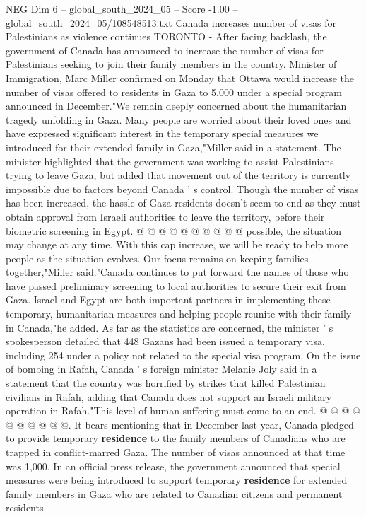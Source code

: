 \begin{textsample}{NEG Dim 6 – global\_south\_2024\_05 – Score -1.00 – global\_south\_2024\_05/108548513.txt}  \label{ex:f6_neg_241}
Canada increases number of visas for Palestinians as violence continues TORONTO - After facing backlash, the government of Canada has announced to increase the number of visas for Palestinians seeking to join their family members in the country.
Minister of Immigration, Marc Miller confirmed on Monday that Ottawa would increase the number of visas offered to residents in Gaza to 5,000 under a special program announced in December."We remain deeply concerned about the humanitarian tragedy unfolding in Gaza.
Many people are worried about their loved ones and have expressed significant interest in the temporary special measures we introduced for their extended family in Gaza,"Miller said in a statement.
The minister highlighted that the government was working to assist Palestinians trying to leave Gaza, but added that movement out of the territory is currently impossible due to factors beyond Canada ' s control.
Though the number of visas has been increased, the hassle of Gaza residents doesn't seem to end as they must obtain approval from Israeli authorities to leave the territory, before their biometric screening in Egypt. @ @ @ @ @ @ @ @ @ @ possible, the situation may change at any time.
With this cap increase, we will be ready to help more people as the situation evolves.
Our focus remains on keeping families together,"Miller said."Canada continues to put forward the names of those who have passed preliminary screening to local authorities to secure their exit from Gaza.
Israel and Egypt are both important partners in implementing these temporary, humanitarian measures and helping people reunite with their family in Canada,"he added.
As far as the statistics are concerned, the minister ' s spokesperson detailed that 448 Gazans had been issued a temporary visa, including 254 under a policy not related to the special visa program.
On the issue of bombing in Rafah, Canada ' s foreign minister Melanie Joly said in a statement that the country was horrified by strikes that killed Palestinian civilians in Rafah, adding that Canada does not support an Israeli military operation in Rafah."This level of human suffering must come to an end. @ @ @ @ @ @ @ @ @ @.
It bears mentioning that in December last year, Canada pledged to provide temporary \textbf{residence} to the family members of Canadians who are trapped in conflict-marred Gaza.
The number of visas announced at that time was 1,000.
In an official press release, the government announced that special measures were being introduced to support temporary \textbf{residence} for extended family members in Gaza who are related to Canadian citizens and permanent residents.

\end{textsample}
